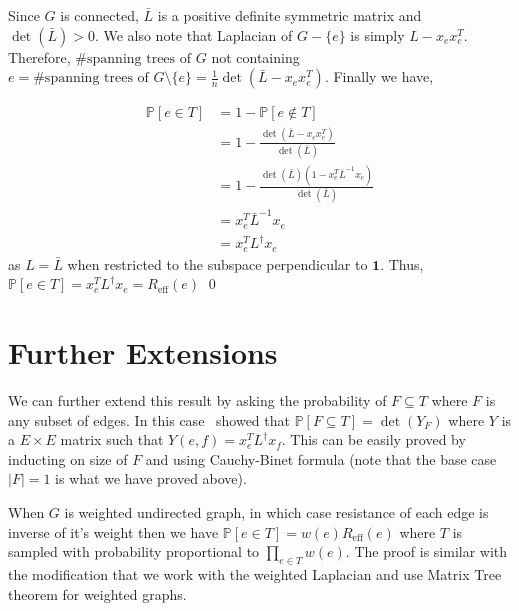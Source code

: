 \documentclass[10pt]{article}
\theoremstyle{plain}
\begin{document}
Since $G$ is connected, $\bar{L}$ is a positive definite symmetric matrix and $\det(\bar{L}) > 0$. We also note that Laplacian of $G - \{e\}$ is simply $L - x_e x_e^T$. Therefore, $\# \text{spanning trees of } G$ not containing $e = \# \text{spanning trees of } G \setminus \{e\} = \frac1n \det(\bar{L} - x_e x_e^T)$.  Finally we have,

\begin{align*}
    \mathbb{P}[e \in T] &= 1 - \mathbb{P}[e \not \in T] \\
    &= 1 - \frac{\det(\bar{L} - x_e x_e^T)}{\det(\bar{L})} \\ 
    &= 1 - \frac{\det(\bar{L}) (1 - x_e^T \bar{L}^{-1} x_e)}{\det(\bar{L})} \\
    &= x_e^T \bar{L}^{-1} x_e \\
    &= x_e^T L^{\dag} x_e
\end{align*}
as $L = \bar{L}$ when restricted to the subspace perpendicular to $\textbf{1}$. Thus, $\mathbb{P}[e \in T] = x_e^T L^{\dag} x_e = R_{\text{eff}}(e)$ \qed

\section{Further Extensions}

We can further extend this result by asking the probability of $F \subseteq T$ where $F$ is any subset of edges. In this case~\cite{burton1993} showed that $\mathbb{P}[F \subseteq T] = \det(Y_F)$ where $Y$ is a $E \times E$ matrix such that $Y(e,f) = x_e^T L^{\dag}x_f$. This can be easily proved by inducting on size of $F$ and using Cauchy-Binet formula (note that the base case $|F|=1$ is what we have proved above).

When $G$ is weighted undirected graph, in which case resistance of each edge is inverse of it's weight then we have $\mathbb{P}[e \in T] = w(e)R_{\text{eff}}(e)$ where $T$ is sampled with probability proportional to $\prod_{e \in T} w(e)$. The proof is similar with the modification that we work with the weighted Laplacian and use Matrix Tree theorem for weighted graphs.


\printbibliography
\end{document}
